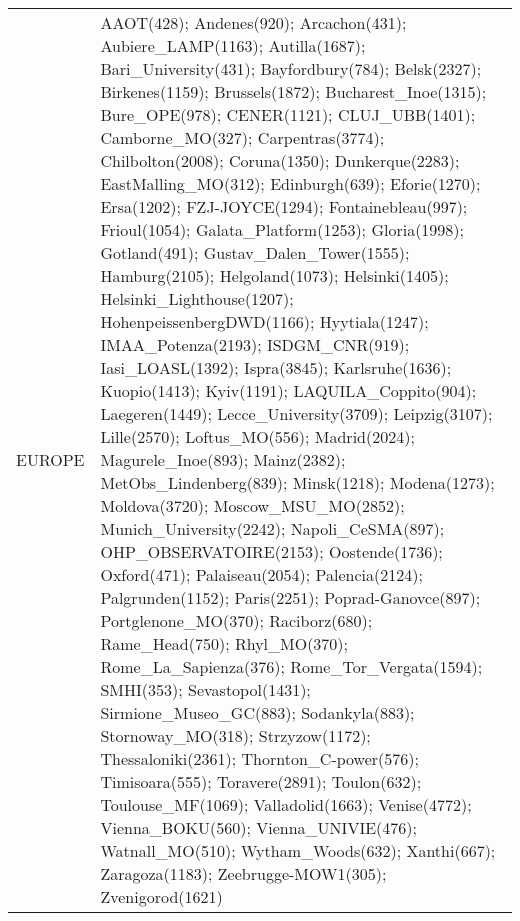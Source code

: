 \documentclass[journal abbreviation, manuscript]{copernicus}
\begin{document}
\begin{table}
\begin{tabularx}{\textwidth}{lX}
                                                                                                                                                                                                                                                                                                                                                                                                                                                                                                                                                                                                          \\
  \middlehline
    EUROPE &                                                                                                                                                                                                                                                                                                                                                                                                                                                                                                                                                                                                                                                         AAOT(428); Andenes(920); Arcachon(431); Aubiere\_LAMP(1163); Autilla(1687); Bari\_University(431); Bayfordbury(784); Belsk(2327); Birkenes(1159); Brussels(1872); Bucharest\_Inoe(1315); Bure\_OPE(978); CENER(1121); CLUJ\_UBB(1401); Camborne\_MO(327); Carpentras(3774); Chilbolton(2008); Coruna(1350); Dunkerque(2283); EastMalling\_MO(312); Edinburgh(639); Eforie(1270); Ersa(1202); FZJ-JOYCE(1294); Fontainebleau(997); Frioul(1054); Galata\_Platform(1253); Gloria(1998); Gotland(491); Gustav\_Dalen\_Tower(1555); Hamburg(2105); Helgoland(1073); Helsinki(1405); Helsinki\_Lighthouse(1207); HohenpeissenbergDWD(1166); Hyytiala(1247); IMAA\_Potenza(2193); ISDGM\_CNR(919); Iasi\_LOASL(1392); Ispra(3845); Karlsruhe(1636); Kuopio(1413); Kyiv(1191); LAQUILA\_Coppito(904); Laegeren(1449); Lecce\_University(3709); Leipzig(3107); Lille(2570); Loftus\_MO(556); Madrid(2024); Magurele\_Inoe(893); Mainz(2382); MetObs\_Lindenberg(839); Minsk(1218); Modena(1273); Moldova(3720); Moscow\_MSU\_MO(2852); Munich\_University(2242); Napoli\_CeSMA(897); OHP\_OBSERVATOIRE(2153); Oostende(1736); Oxford(471); Palaiseau(2054); Palencia(2124); Palgrunden(1152); Paris(2251); Poprad-Ganovce(897); Portglenone\_MO(370); Raciborz(680); Rame\_Head(750); Rhyl\_MO(370); Rome\_La\_Sapienza(376); Rome\_Tor\_Vergata(1594); SMHI(353); Sevastopol(1431); Sirmione\_Museo\_GC(883); Sodankyla(883); Stornoway\_MO(318); Strzyzow(1172); Thessaloniki(2361); Thornton\_C-power(576); Timisoara(555); Toravere(2891); Toulon(632); Toulouse\_MF(1069); Valladolid(1663); Venise(4772); Vienna\_BOKU(560); Vienna\_UNIVIE(476); Watnall\_MO(510); Wytham\_Woods(632); Xanthi(667); Zaragoza(1183); Zeebrugge-MOW1(305); Zvenigorod(1621) \\

\end{tabularx}
\end{table}
\end{document}
